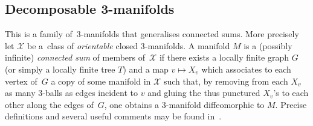 \documentclass[10pt,a4paper]{amsart}
\numberwithin{equation}{section}
\begin{document}
\subsection{Decomposable 3-manifolds}\label{sec:decomposable}

This is a family of~$3$-manifolds that generalises connected sums. More precisely let $\mathcal X$ be a~class of {\it orientable }closed $3$-manifolds. A manifold $M$ is a (possibly infinite)
{\it connected sum} of members of~$\mathcal X$ if there exists a locally finite graph $G$ (or simply a locally finite tree $T$) and a map $v\mapsto X_v$ which associates to each vertex of~$G$ a copy of some manifold in $\mathcal X$ such that, by removing from each $X_v$ as many $3$-balls as edges incident to $v$ and gluing the thus punctured $X_v$'s to each other
along the edges of~$G$, one obtains a $3$-manifold diffeomorphic to $M$. Precise definitions and several useful comments may be found in~\cite{BBM}.
\end{document}
